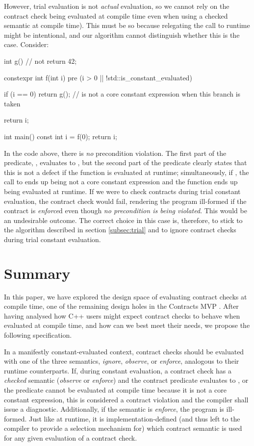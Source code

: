 However, trial evaluation is not \emph{actual} evaluation, so we cannot rely on the contract check being evaluated at compile time even when using a checked semantic at compile time). This must be so because relegating the call to runtime might be intentional, and our algorithm cannot distinguish whether this is the case. Consider:

\begin{codeblock}
int g() {   // not 
  return 42;
}

constexpr int f(int i)
  pre (i > 0 || !std::is_constant_evaluated)
{
  if (i == 0)
    return g();   //  is not a core constant expression when this branch is taken

  return i;
}

int main() {
  const int i = f(0);
  return i;
}
\end{codeblock}

In the code above, there is \emph{no} precondition violation. The first part of the predicate, , evaluates to , but the second part of the predicate clearly states that this is not a defect if the function is evaluated at runtime; simultaneously, if , the call to  ends up being not a core constant expression and the function  ends up being evaluated at runtime. If we were to check contracts during trial constant evaluation, the contract check would fail, rendering the program ill-formed if the contract is \emph{enforce}d even though \emph{no precondition is being violated}. This would be an undesirable outcome. The correct choice in this case is, therefore, to stick to the algorithm described in section \ref{subsec:trial} and to ignore contract checks during trial constant evaluation.

\section{Summary}

In this paper, we have explored the design space of evaluating contract checks at compile time, one of the remaining design holes in the Contracts MVP \cite{P2900R1}. After having analysed how C++ users might expect contract checks to behave when evaluated at compile time, and how can we best meet their needs, we propose the following specification.

In a manifestly constant-evaluated context, contract checks should be evaluated with one of the three semantics, \emph{ignore}, \emph{observe}, or \emph{enforce}, analogous to their runtime counterparts. If, during constant evaluation, a contract check has a \emph{checked} semantic (\emph{observe} or \emph{enforce}) and the contract predicate evaluates to , or the predicate cannot be evaluated at compile time because it is not a core constant expression, this is considered a contract violation and the compiler shall issue a diagnostic. Additionally, if the semantic is \emph{enforce}, the program is ill-formed. Just like at runtime, it is implementation-defined (and thus left to the compiler to provide a selection mechanism for) which contract semantic is used for any given evaluation of a contract check.

